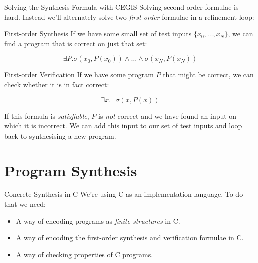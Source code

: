 \documentclass[xcolor=pdftex,t,11pt]{beamer}
\begin{document}
\begin{frame}[fragile]{Solving the Synthesis Formula with CEGIS}
 Solving second order formulae is hard.  Instead we'll alternately solve two \emph{first-order} formulae
 in a refinement loop:

 \vspace{1cm}
 
\end{frame}

\begin{frame}{First-order Synthesis}
 If we have some small set of test inputs $\{ x_0, \dots, x_N\}$, we can find a program that is correct on just that set:

 $$\exists P . \sigma(x_0, P(x_0)) \wedge \dots \wedge \sigma(x_N, P(x_N))$$
\end{frame}

\begin{frame}{First-order Verification}
 If we have some program $P$ that might be correct, we can check whether it is in fact correct:
 
 $$\exists x . \lnot \sigma(x, P(x))$$
 
 If this formula is \emph{satisfiable}, $P$ is \emph{not} correct and we have found an input on which it is incorrect.
 We can add this input to our set of test inputs and loop back to synthesising a new program.
\end{frame}

\section{Program Synthesis}
\iffalse
\begin{frame}{Concrete Synthesis in C}
 We're using C as an implementation language.  To do that we need:
 
 \begin{itemize}
  \item A way of encoding programs as \emph{finite structures} in C.
  \item A way of encoding the first-order synthesis and verification formulae in C.
  \item A way of checking properties of C programs.
 \end{itemize}
\end{frame}
\end{document}
